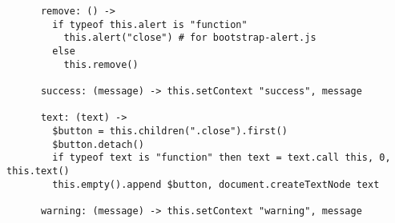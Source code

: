 \begin{lstlisting}
      remove: () ->
        if typeof this.alert is "function"
          this.alert("close") # for bootstrap-alert.js
        else
          this.remove()
      
      success: (message) -> this.setContext "success", message
      
      text: (text) ->
        $button = this.children(".close").first()
        $button.detach()
        if typeof text is "function" then text = text.call this, 0, this.text()
        this.empty().append $button, document.createTextNode text
      
      warning: (message) -> this.setContext "warning", message
\end{lstlisting}

